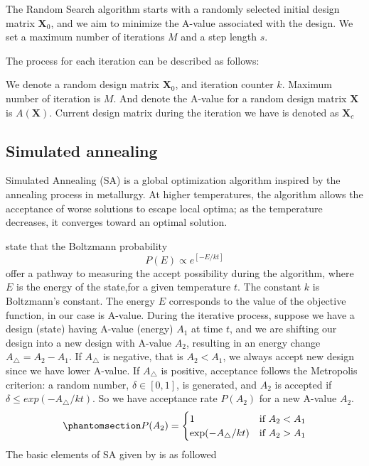 \documentclass[
  a4paper,
  oneside,
  openany,
  12pt,
  onecolumn]{book}
\theoremstyle{definition}
\theoremstyle{plain}
\theoremstyle{remark}
\begin{document}
The Random Search algorithm starts with a randomly selected initial
design matrix \(\boldsymbol{X}_0\), and we aim to minimize the A-value
associated with the design. We set a maximum number of iterations \(M\)
and a step length \(s\).

The process for each iteration can be described as follows:

We denote a random design matrix \(\boldsymbol{X}_0\), and iteration
counter \(k\). Maximum number of iteration is \(M\). And denote the
A-value for a random design matrix \(\boldsymbol{X}\) is
\(A(\boldsymbol{X})\). Current design matrix during the iteration we
have is denoted as \(\boldsymbol{X}_c\)

\subsection{Simulated annealing}\label{simulated-annealing}

Simulated Annealing (SA) is a global optimization algorithm inspired by
the annealing process in metallurgy. At higher temperatures, the
algorithm allows the acceptance of worse solutions to escape local
optima; as the temperature decreases, it converges toward an optimal
solution.

\citet{butler2013optimal} state that the Boltzmann probability \[
P(E)\propto e^{[-E/kt]}
\] offer a pathway to measuring the accept possibility during the
algorithm, where \(E\) is the energy of the state,for a given
temperature \(t\). The constant \(k\) is Boltzmann's constant. The
energy \(E\) corresponds to the value of the objective function, in our
case is A-value. During the iterative process, suppose we have a design
(state) having A-value (energy) \(A_1\) at time \(t\), and we are
shifting our design into a new design with A-value \(A_2\), resulting in
an energy change \(A_{\bigtriangleup} = A_2 - A_1\). If
\(A_{\bigtriangleup}\) is negative, that is \(A_2 < A_1\), we always
accept new design since we have lower A-value. If \(A_{\bigtriangleup}\)
is positive, acceptance follows the Metropolis criterion: a random
number, \(\delta \in [0,1]\), is generated, and \(A_2\) is accepted if
\(\delta \leq exp(-A_{\bigtriangleup}/kt)\). So we have acceptance rate
\(P(A_2)\) for a new A-value \(A_2\).
\begin{equation}\phantomsection\label{eq-prob}{
P(A_2)=
\begin{cases}
1 & \text{if } A_2<A_1 \\
\exp(-A_{\bigtriangleup}/kt) & \text{if } A_2>A_1\\
\end{cases}
}\end{equation} The basic elements of SA given by
\citet{bertsimas1993simulated} is as followed
\end{document}
